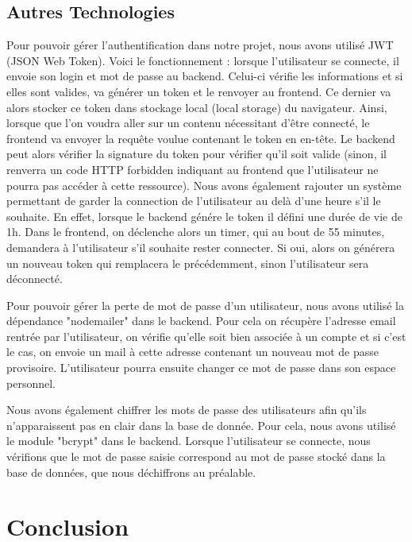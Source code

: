 \documentclass[a4paper]{article}
\begin{document}
\subsection{Autres Technologies}
Pour pouvoir gérer l'authentification dans notre projet, nous avons utilisé JWT (JSON Web Token). Voici le fonctionnement : lorsque l'utilisateur se connecte, il envoie son login et mot de passe au backend. Celui-ci vérifie les informations et si elles sont valides, va générer un token et le renvoyer au frontend. Ce dernier va alors stocker ce token dans stockage local (local storage) du navigateur. Ainsi, lorsque que l'on voudra aller sur un contenu nécessitant d'être connecté, le frontend va envoyer la requête voulue contenant le token en en-tête. Le backend peut alors vérifier la signature du token pour vérifier qu'il soit valide (sinon, il renverra un code HTTP forbidden indiquant au frontend que l'utilisateur ne pourra pas accéder à cette ressource). Nous avons également rajouter un système permettant de garder la connection de l'utilisateur au delà d'une heure s'il le souhaite. En effet, lorsque le backend génére le token il défini une durée de vie de 1h. Dans le frontend, on déclenche alors un timer, qui au bout de 55 minutes, demandera à l'utilisateur s'il souhaite rester connecter. Si oui, alors on générera un nouveau token qui remplacera le précédemment, sinon l'utilisateur sera déconnecté.\newline

Pour pouvoir gérer la perte de mot de passe d'un utilisateur, nous avons utilisé la dépendance "nodemailer" dans le backend. Pour cela on récupère l'adresse email rentrée par l'utilisateur, on vérifie qu'elle soit bien associée à un compte et si c'est le cas, on envoie un mail à cette adresse contenant un nouveau mot de passe provisoire. L'utilisateur pourra ensuite changer ce mot de passe dans son espace personnel.\newline

Nous avons également chiffrer les mots de passe des utilisateurs afin qu'ils n'apparaissent pas en clair dans la base de donnée. Pour cela, nous avons utilisé le module "bcrypt" dans le backend. Lorsque l'utilisateur se connecte, nous vérifions que le mot de passe saisie correspond au mot de passe stocké dans la base de données, que nous déchiffrons au préalable.

\section{Conclusion}
\end{document}
